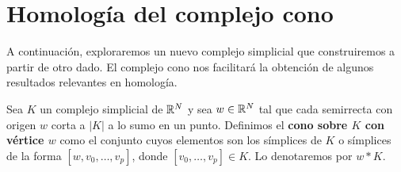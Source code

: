 %
%
%
%
%
%
%

\section{Homología del complejo cono}
A continuación, exploraremos un nuevo complejo simplicial que construiremos a partir
de otro dado. El complejo cono nos facilitará la obtención de algunos resultados
relevantes en homología.
\begin{definicion}
	Sea \(K\) un complejo simplicial de \(\mathbb{R}^{N}\) y sea \(w \in \mathbb{R}^{N}\) tal que cada semirrecta
	con origen \(w\) corta a \(|K|\) a lo sumo en un punto. Definimos el \textbf{cono
		sobre \(K\) con vértice \(w\)} como el conjunto cuyos elementos son los símplices de
	\(K\) o símplices de la forma \([w,v_{0},\ldots,v_{p}]\), donde
	\([v_{0}, \ldots, v_{p}] \in K\). Lo denotaremos por \(w \ast K\).
\end{definicion}

